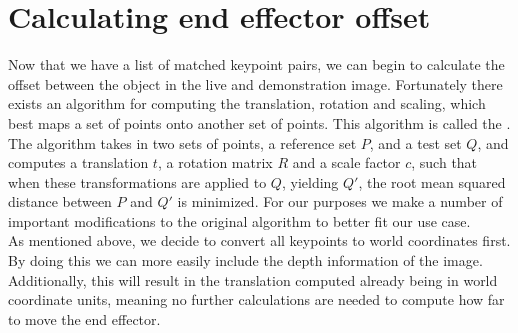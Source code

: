 \section{Calculating end effector offset}
\label{sec:kabsch}
Now that we have a list of matched keypoint pairs, we can begin to calculate the offset between the object in the live and demonstration image. Fortunately there exists an algorithm for computing the translation, rotation and scaling, which best maps a set of points onto another set of points. This algorithm is called the  \cite{kabsch}. The algorithm takes in two sets of points, a reference set $P$, and a test set $Q$, and computes a translation $t$, a rotation matrix $R$ and a scale factor $c$, such that when these transformations are applied to $Q$, yielding $Q'$, the root mean squared distance between $P$ and $Q'$ is minimized. For our purposes we make a number of important modifications to the original algorithm to better fit our use case.\\

As mentioned above, we decide to convert all keypoints to world coordinates first. By doing this we can more easily include the depth information of the image. Additionally, this will result in the translation computed already being in world coordinate units, meaning no further calculations are needed to compute how far to move the end effector.\\

        
